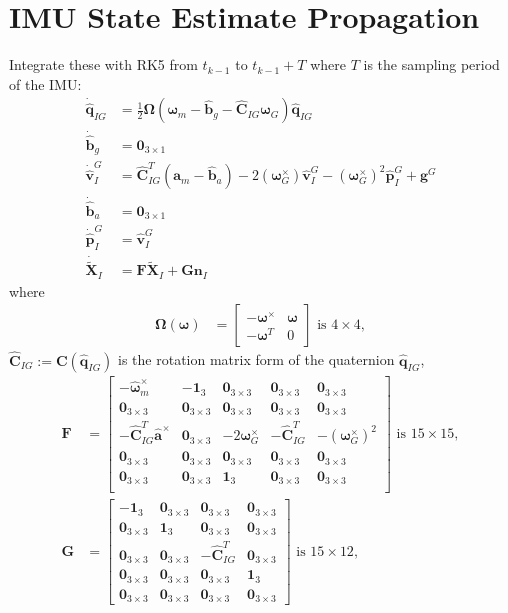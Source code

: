 \documentclass[10pt,letterpaper,fleqn,oneside]{article}
\newcommand{\nl}{\\[0.5em]}
\def\Vec#1{\mathbf{#1}} %
\newcommand{\bbm}{\begin{bmatrix}}
\newcommand{\ebm}{\end{bmatrix}}
\begin{document}
\section{IMU State Estimate Propagation}
Integrate these with RK5 from $t_{k-1}$ to $t_{k-1} + T$ where $T$ is the sampling period of the IMU:
\begin{align}
\dot{\hat{\Vec{q}}}_{I G} &= \frac{1}{2}\boldsymbol{\Omega}\left(\boldsymbol{\omega}_m - \hat{\Vec{b}}_g - \hat{\Vec{C}}_{I G} \boldsymbol{\omega}_G \right)\hat{\Vec{q}}_{I G} \nl
\dot{\hat{\Vec{b}}}_g  &= \Vec{0}_{3\times1} \nl
\dot{\hat{\Vec{v}}}^G_I &= \hat{\Vec{C}}_{I G}^T\left(\Vec{a}_m - \hat{\Vec{b}}_a\right) - 2\left(\boldsymbol{\omega}_G^\times\right)\hat{\Vec{v}}^G_I - \left(\boldsymbol{\omega}_G^\times\right)^2 \left.\hat{\Vec{p}}^G_I\right. + \Vec{g}^G \nl
\dot{\hat{\Vec{b}}}_a &= \Vec{0}_{3\times1} \nl
\dot{\hat{\Vec{p}}}^G_I &= \hat{\Vec{v}}^G_I \nl
\dot{\widetilde{\Vec{X}}}_I &= \Vec{F}\widetilde{\Vec{X}}_I + \Vec{G}\Vec{n}_I
\end{align}
where
\begin{align}
\boldsymbol{\Omega}\left(\boldsymbol{\omega}\right) &= \bbm -\boldsymbol{\omega}^\times & \boldsymbol{\omega} \nl
																										-\boldsymbol{\omega}^T & 0
																								\ebm 
																								\text{ is }4\times4,
\end{align}
$\hat{\Vec{C}}_{I G} := \Vec{C}(\hat{\Vec{q}}_{I G})$ is the rotation matrix form of the quaternion $\hat{\Vec{q}}_{I G}$,
\begin{align}
\Vec{F} &= \bbm	-\hat{\boldsymbol{\omega}}_m^\times & -\Vec{1}_3 & \Vec{0}_{3\times3} & \Vec{0}_{3\times3} & \Vec{0}_{3\times3} \nl
					\Vec{0}_{3\times3} & \Vec{0}_{3\times3} & \Vec{0}_{3\times3} & \Vec{0}_{3\times3} & \Vec{0}_{3\times3} \nl
					-\hat{\Vec{C}}_{I G}^T\hat{\Vec{a}}^\times & \Vec{0}_{3\times3} & -2\boldsymbol{\omega}_G^\times & -\hat{\Vec{C}}_{I G}^T & -\left(\boldsymbol{\omega}_G^\times\right)^2 \nl
					\Vec{0}_{3\times3} & \Vec{0}_{3\times3} & \Vec{0}_{3\times3} & \Vec{0}_{3\times3} & \Vec{0}_{3\times3} \nl
					\Vec{0}_{3\times3} & \Vec{0}_{3\times3} & \Vec{1}_3 & \Vec{0}_{3\times3} & \Vec{0}_{3\times3} \nl
		\ebm \text{ is } 15\times15, \nl
\Vec{G} &= 	\bbm	-\Vec{1}_3 & \Vec{0}_{3\times3} & \Vec{0}_{3\times3} & \Vec{0}_{3\times3} \nl
								\Vec{0}_{3\times3} & \Vec{1}_3 & \Vec{0}_{3\times3} & \Vec{0}_{3\times3} \nl
								\Vec{0}_{3\times3} & \Vec{0}_{3\times3} & -\hat{\Vec{C}}_{I G}^T & \Vec{0}_{3\times3} \nl
								\Vec{0}_{3\times3} & \Vec{0}_{3\times3} & \Vec{0}_{3\times3} & \Vec{1}_3 \nl
								\Vec{0}_{3\times3} & \Vec{0}_{3\times3} & \Vec{0}_{3\times3} & \Vec{0}_{3\times3}
					\ebm \text{ is } 15\times12,
\end{align}
\end{document}
